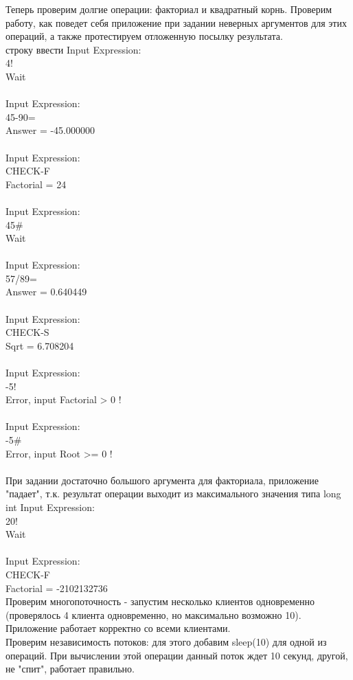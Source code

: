 \documentclass[12pt,a4paper]{report}
\begin{document}
Теперь проверим долгие операции: факториал и квадратный корнь. Проверим работу, как поведет себя приложение при задании неверных аргументов для этих операций, а также протестируем отложенную посылку результата. \\
строку ввести
Input Expression:\\
4!\\
Wait\\
\\
Input Expression:\\
45-90=\\
Answer = -45.000000\\
\\
Input Expression:\\
CHECK-F\\
Factorial = 24\\
\\
Input Expression:\\
45#\\
Wait\\
\\
Input Expression:\\
57/89=\\
Answer = 0.640449\\
\\
Input Expression:\\
CHECK-S\\
Sqrt = 6.708204\\
\\
Input Expression:\\
-5!\\
Error, input Factorial > 0 !\\
\\
Input Expression:\\
-5#\\
Error, input Root >= 0 !\\
\\
При задании достаточно большого аргумента для факториала, приложение "падает", т.к.
результат операции выходит из максимального значения типа long int
Input Expression:\\
20!\\
Wait\\
\\
Input Expression:\\
CHECK-F\\
Factorial = -2102132736\\

Проверим многопоточность - запустим несколько клиентов одновременно (проверялось 4 клиента одновременно, но максимально возможно 10). Приложение работает корректно со всеми клиентами.\\
Проверим независимость потоков: для этого добавим sleep(10) для одной из операций. При вычислении этой операции данный поток ждет 10 секунд, другой, не "спит", работает правильно.
\end{document}
